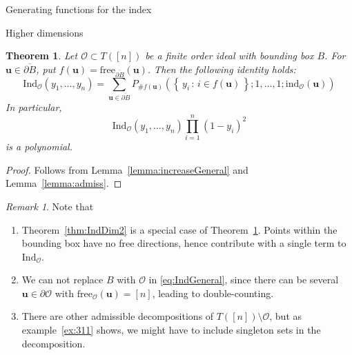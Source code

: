 \documentclass[reqno,a4paper,10pt]{amsart}
\theoremstyle{definition}
\theoremstyle{remark}
\newtheorem{remark}[definition]{Remark}
\theoremstyle{plain}
\newtheorem{theorem}[definition]{Theorem}
\newcommand{\vek}[1]{\boldsymbol{#1}}
\newcommand\setsuchas[2]{\left\{\,{#1}\,:\,{#2}\,\right\}}
\newcommand{\ind}{\mathrm{ind}}
\newcommand{\Ind}{\mathrm{Ind}}
\begin{document}
\begin{section}{Generating functions for the index}
\begin{subsection}{Higher dimensions}
  \begin{theorem}\label{thm:IndGenForm}
    Let \(\mathcal{O} \subset T([n])\) be a finite order ideal with
    bounding box \(B\). For \(\vek{u} \in \overline{\partial B}\), put
    \(f(\vek{u}) = \mathrm{free}_{\overline{\partial B}}(\vek{u})\).
    Then the following identity holds:
    \begin{equation}
      \label{eq:IndGeneral}
      \Ind_{\mathcal{O}}(y_1,\dots,y_n) = 
      \sum_{\vek{u} \in \overline{\partial B}} 
      P_{\# f(\vek{u})}(\setsuchas{y_i}{i \in  f(\vek{u})};
        1,\dots,1; \ind_{\mathcal{O}}(\vek{u})) 
    \end{equation}   
    In particular,
    \begin{displaymath}
      \Ind_{\mathcal{O}}(y_1,\dots,y_n) \prod_{i=1}^n (1-y_i)^2
    \end{displaymath}
    is a polynomial.
  \end{theorem}
  \begin{proof}
    Follows from Lemma~\ref{lemma:increaseGeneral} and Lemma~\ref{lemma:admiss}.
  \end{proof}

  \begin{remark}
  Note that
  \begin{enumerate}
  \item  Theorem~\ref{thm:IndDim2} is a special case of
    Theorem~\ref{thm:IndGenForm}. Points within the bounding box have no
    free directions, hence contribute with a single term to
    \(\Ind_{\mathcal{O}}\). 
  \item We can not replace \(B\)
    with \(\mathcal{O}\) in \eqref{eq:IndGeneral}, since there can be
    several \(\vek{u} \in \partial \mathcal{O}\) with
    \(\mathrm{free}_{\mathcal{O}}(\vek{u}) = [n]\), leading to
    double-counting.
  \item There are other admissible decompositions of
    \(T([n])\setminus \mathcal{O}\), but as
    example~\ref{ex:311} shows, we might have to include singleton sets in
    the decomposition.
  \end{enumerate}
\end{remark}


\end{subsection}
\end{section}

\raggedright


\end{document}
